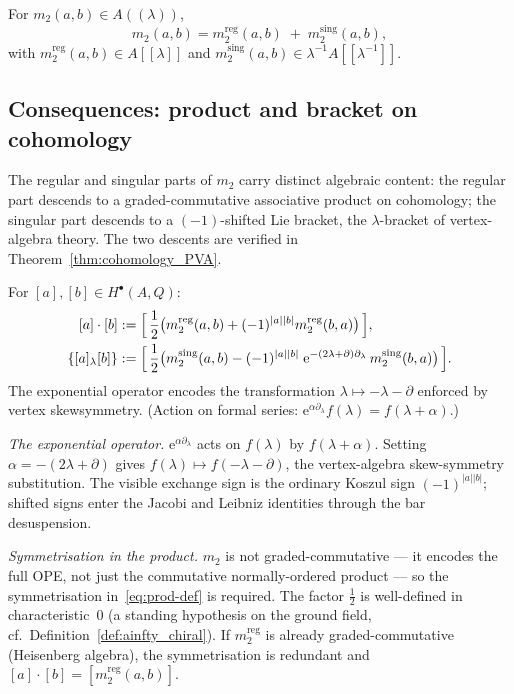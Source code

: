For $m_2(a,b)\in A((\lambda))$,
\[
m_2(a,b) = m_2^{\mathrm{reg}}(a,b)\;+\;m_2^{\mathrm{sing}}(a,b),
\]
with $m_2^{\mathrm{reg}}(a,b)\in A[\![\lambda]\!]$ and $m_2^{\mathrm{sing}}(a,b)\in \lambda^{-1}A[\![\lambda^{-1}]\!]$.

\subsection{Consequences: product and bracket on cohomology}
\label{subsec:product-bracket}
\label{def:product}
\label{def:lambda-bracket}

The regular and singular parts of $m_2$ carry distinct algebraic
content: the regular part descends to a graded-commutative
associative product on cohomology; the singular part descends to a
$(-1)$-shifted Lie bracket, the $\lambda$-bracket of vertex-algebra
theory. The two descents are verified in
Theorem~\textup{\ref{thm:cohomology_PVA}}.

For $[a],[b]\in H^\bullet(A,Q)$:
\begin{align}
\label{eq:prod-def}
[a]\cdot[b] &:= \Bigl[\, \frac12\bigl(m_2^{\mathrm{reg}}(a,b) + (-1)^{|a||b|}m_2^{\mathrm{reg}}(b,a)\bigr)\,\Bigr],\\
\label{eq:bracket-def}
\{[a]{}_\lambda [b]\} &:= \Bigl[\, \frac12\bigl(m_2^{\mathrm{sing}}(a,b) - (-1)^{|a||b|}\; \mathrm{e}^{-(2\lambda+\partial)\partial_\lambda}\,m_2^{\mathrm{sing}}(b,a)\bigr)\,\Bigr].
\end{align}
The exponential operator encodes the transformation $\lambda\mapsto -\lambda-\partial$ enforced by vertex skewsymmetry. (Action on formal series: $\mathrm{e}^{\alpha\partial_\lambda}f(\lambda)=f(\lambda+\alpha)$.)

\smallskip\noindent
\emph{The exponential operator.}\;
$\mathrm{e}^{\alpha\partial_\lambda}$ acts on $f(\lambda)$ by
$f(\lambda+\alpha)$. Setting $\alpha = -(2\lambda+\partial)$ gives
$f(\lambda) \mapsto f(-\lambda-\partial)$, the vertex-algebra
skew-symmetry substitution. The visible exchange sign is the
ordinary Koszul sign $(-1)^{|a||b|}$; shifted signs enter the
Jacobi and Leibniz identities through the bar desuspension.

\smallskip\noindent
\emph{Symmetrisation in the product.}\;
$m_2$ is not graded-commutative — it encodes the full OPE, not
just the commutative normally-ordered product — so the
symmetrisation in~\eqref{eq:prod-def} is required. The factor
$\frac{1}{2}$ is well-defined in characteristic~$0$ (a standing
hypothesis on the ground field, cf.\
Definition~\ref{def:ainfty_chiral}). If $m_2^{\mathrm{reg}}$ is
already graded-commutative (Heisenberg algebra), the symmetrisation
is redundant and $[a]\cdot[b] = [m_2^{\mathrm{reg}}(a,b)]$.

